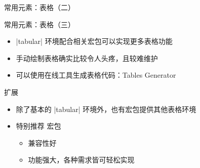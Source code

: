 \begin{frame}[fragile]{常用元素：表格（二）}
\end{frame}

\begin{frame}[fragile]{常用元素：表格（三）}
  \begin{itemize}
    \item |tabular| 环境配合相关宏包可以实现更多表格功能
    \item 手动绘制表格确实比较令人头疼，且较难维护
    \item 可以使用在线工具生成表格代码：Tables Generator 
  \end{itemize}
  \begin{block}{扩展}
    \begin{itemize}
      \item 除了基本的 |tabular| 环境外，也有宏包提供其他表格环境
      \item 特别推荐  宏包
            \begin{itemize}
              \item 兼容性好
              \item 功能强大，各种需求皆可轻松实现
            \end{itemize}
    \end{itemize}
  \end{block}
\end{frame}
